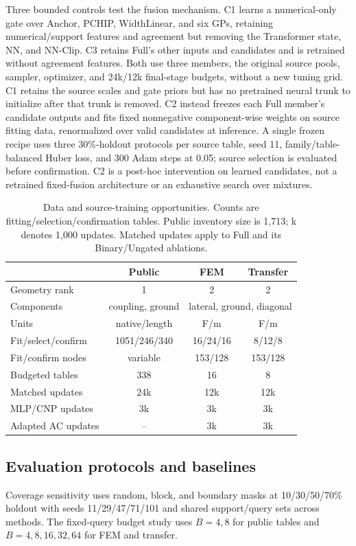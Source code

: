 \documentclass[conference,9pt,letterpaper]{IEEEtran}
\begin{document}
Three bounded controls test the fusion mechanism. C1 learns a numerical-only
gate over Anchor, PCHIP, WidthLinear, and six GPs, retaining numerical/support
features and agreement but removing the Transformer state, NN, and NN-Clip.
C3 retains Full's other inputs and candidates and is retrained without
agreement features. Both use three members, the original source pools,
sampler, optimizer, and 24k/12k final-stage budgets, without a new tuning grid.
C1 retains the source scales and gate priors but has no pretrained neural
trunk to initialize after that trunk is removed.
C2 instead freezes each Full member's candidate outputs and fits fixed
nonnegative component-wise weights on source fitting data, renormalized
over valid candidates at inference. A single frozen recipe uses three
30\%-holdout protocols per source table, seed 11, family/table-balanced
Huber loss, and 300 Adam steps at 0.05; source selection is evaluated before
confirmation. C2 is a post-hoc intervention on learned candidates, not a
retrained fixed-fusion architecture or an exhaustive search over mixtures.

\begin{table}[t]
\centering
\caption{Data and source-training opportunities. Counts are fitting/selection/confirmation tables. Public inventory size is 1,713; k denotes 1,000 updates. Matched updates apply to Full and its Binary/Ungated ablations.}
\label{tab:data}
\footnotesize\setlength{\tabcolsep}{2.5pt}
\begin{tabular}{lccc}\toprule
 & Public & FEM & Transfer\\\midrule
Geometry rank & 1 & 2 & 2\\
Components & coupling, ground & \multicolumn{2}{c}{lateral, ground, diagonal}\\
Units & native/length & F/m & F/m\\
Fit/select/confirm & 1051/246/340 & 16/24/16 & 8/12/8\\
Fit/confirm nodes & variable & 153/128 & 153/128\\
Budgeted tables & 338 & 16 & 8\\
Matched updates & 24k & 12k & 12k\\
MLP/CNP updates & 3k & 3k & 3k\\
Adapted AC updates & -- & 3k & 3k\\\bottomrule
\end{tabular}
\end{table}

\subsection{Evaluation protocols and baselines}
Coverage sensitivity uses random, block, and boundary masks at 10/30/50/70\% holdout with seeds 11/29/47/71/101 and shared support/query sets across methods. The fixed-query budget study uses $B=4,8$ for public tables and $B=4,8,16,32,64$ for FEM and transfer.
\end{document}
